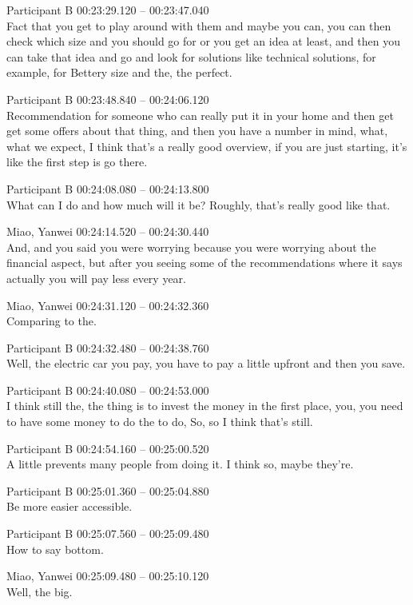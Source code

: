 {Participant B 00:23:29.120 -- 00:23:47.040 \\
Fact that you get to play around with them and maybe you can, you can then check which size and you should go for or you get an idea at least, and then you can take that idea and go and look for solutions like technical solutions, for example, for Bettery size and the, the perfect.

Participant B 00:23:48.840 -- 00:24:06.120 \\
Recommendation for someone who can really put it in your home and then get get some offers about that thing, and then you have a number in mind, what, what we expect, I think that's a really good overview, if you are just starting, it's like the first step is go there.

Participant B 00:24:08.080 -- 00:24:13.800 \\
What can I do and how much will it be? Roughly, that's really good like that.

Miao, Yanwei 00:24:14.520 -- 00:24:30.440 \\
And, and you said you were worrying because you were worrying about the financial aspect, but after you seeing some of the recommendations where it says actually you will pay less every year.

Miao, Yanwei 00:24:31.120 -- 00:24:32.360 \\
Comparing to the.

Participant B 00:24:32.480 -- 00:24:38.760 \\
Well, the electric car you pay, you have to pay a little upfront and then you save.

Participant B 00:24:40.080 -- 00:24:53.000 \\
I think still the, the thing is to invest the money in the first place, you, you need to have some money to do the to do, So, so I think that's still.

Participant B 00:24:54.160 -- 00:25:00.520 \\
A little prevents many people from doing it. I think so, maybe they're.

Participant B 00:25:01.360 -- 00:25:04.880 \\
Be more easier accessible.

Participant B 00:25:07.560 -- 00:25:09.480 \\
How to say bottom.

Miao, Yanwei 00:25:09.480 -- 00:25:10.120 \\
Well, the big.

}
